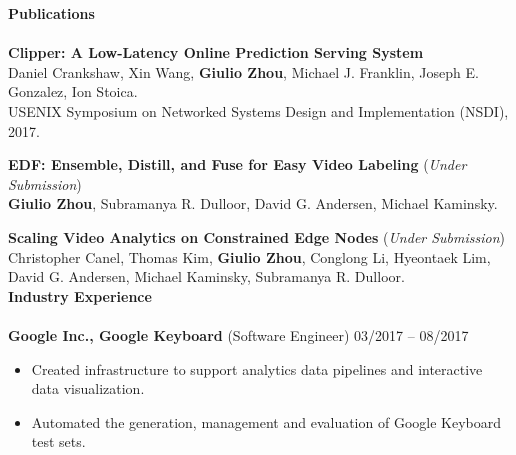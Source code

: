 \documentclass{article}
\begin{document}

\noindent
\textbf{\Large Publications}\\[-2mm]
\HRule\\
\noindent
\textbf{Clipper: A Low-Latency Online Prediction Serving System} \\
Daniel Crankshaw, Xin Wang, \textbf{Giulio Zhou}, Michael J. Franklin, Joseph E. Gonzalez, Ion Stoica. \\
USENIX Symposium on Networked Systems Design and Implementation (NSDI), 2017. \\
\vspace{-3mm}

\noindent
\textbf{EDF: Ensemble, Distill, and Fuse for Easy Video Labeling} (\textit{Under Submission}) \\
\textbf{Giulio Zhou}, Subramanya R. Dulloor, David G. Andersen, Michael Kaminsky. \\
\vspace{-3mm}

\noindent
\textbf{Scaling Video Analytics on Constrained Edge Nodes} (\textit{Under Submission}) \\
Christopher Canel, Thomas Kim, \textbf{Giulio Zhou}, Conglong Li, Hyeontaek Lim, David G. Andersen, Michael Kaminsky, Subramanya R. Dulloor. \\

\noindent
\textbf{{\Large Industry Experience}}\\[-2mm]
\HRule\\
\textbf{Google Inc., Google Keyboard} (Software Engineer)
\hfill 03/2017 -- 08/2017\\
\begin{itemize}
\vspace{-6.5mm}
\item Created infrastructure to support analytics data pipelines and interactive data visualization.
\vspace{-2.5mm}
\item Automated the generation, management and evaluation of Google Keyboard test sets.
\end{itemize}
\vspace{-2mm}
\end{document}
